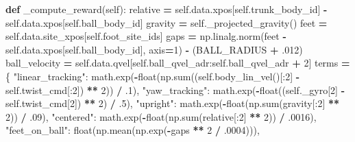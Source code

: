 \documentclass[
  chinese,
  11pt,
  letterpaper,
]{article}
\newenvironment{Shaded}{\begin{snugshade}}{\end{snugshade}}
\newcommand{\BuiltInTok}[1]{#1}
\newcommand{\DecValTok}[1]{\textcolor[rgb]{0.00,0.00,0.81}{#1}}
\newcommand{\FloatTok}[1]{\textcolor[rgb]{0.00,0.00,0.81}{#1}}
\newcommand{\KeywordTok}[1]{\textcolor[rgb]{0.13,0.29,0.53}{\textbf{#1}}}
\newcommand{\NormalTok}[1]{#1}
\newcommand{\OperatorTok}[1]{\textcolor[rgb]{0.81,0.36,0.00}{\textbf{#1}}}
\newcommand{\StringTok}[1]{\textcolor[rgb]{0.31,0.60,0.02}{#1}}
\newcommand{\VariableTok}[1]{\textcolor[rgb]{0.00,0.00,0.00}{#1}}
\renewenvironment{Shaded}{\par\smallskip}{\par\smallskip}
\begin{document}
\begin{Shaded}
\begin{Highlighting}[]
    \KeywordTok{def}\NormalTok{ \_compute\_reward(}\VariableTok{self}\NormalTok{):}
\NormalTok{        relative }\OperatorTok{=} \VariableTok{self}\NormalTok{.data.xpos[}\VariableTok{self}\NormalTok{.trunk\_body\_id] }\OperatorTok{{-}} \VariableTok{self}\NormalTok{.data.xpos[}\VariableTok{self}\NormalTok{.ball\_body\_id]}
\NormalTok{        gravity }\OperatorTok{=} \VariableTok{self}\NormalTok{.\_projected\_gravity()}
\NormalTok{        feet }\OperatorTok{=} \VariableTok{self}\NormalTok{.data.site\_xpos[}\VariableTok{self}\NormalTok{.foot\_site\_ids]}
\NormalTok{        gaps }\OperatorTok{=}\NormalTok{ np.linalg.norm(feet }\OperatorTok{{-}} \VariableTok{self}\NormalTok{.data.xpos[}\VariableTok{self}\NormalTok{.ball\_body\_id], axis}\OperatorTok{=}\DecValTok{1}\NormalTok{) }\OperatorTok{{-}}\NormalTok{ (BALL\_RADIUS }\OperatorTok{+} \FloatTok{.012}\NormalTok{)}
\NormalTok{        ball\_velocity }\OperatorTok{=} \VariableTok{self}\NormalTok{.data.qvel[}\VariableTok{self}\NormalTok{.ball\_qvel\_adr:}\VariableTok{self}\NormalTok{.ball\_qvel\_adr }\OperatorTok{+} \DecValTok{2}\NormalTok{]}
\NormalTok{        terms }\OperatorTok{=}\NormalTok{ \{}
            \StringTok{"linear\_tracking"}\NormalTok{: math.exp(}\OperatorTok{{-}}\BuiltInTok{float}\NormalTok{(np.}\BuiltInTok{sum}\NormalTok{((}\VariableTok{self}\NormalTok{.body\_lin\_vel()[:}\DecValTok{2}\NormalTok{] }\OperatorTok{{-}} \VariableTok{self}\NormalTok{.twist\_cmd[:}\DecValTok{2}\NormalTok{]) }\OperatorTok{**} \DecValTok{2}\NormalTok{)) }\OperatorTok{/} \FloatTok{.1}\NormalTok{),}
            \StringTok{"yaw\_tracking"}\NormalTok{: math.exp(}\OperatorTok{{-}}\BuiltInTok{float}\NormalTok{((}\VariableTok{self}\NormalTok{.\_gyro[}\DecValTok{2}\NormalTok{] }\OperatorTok{{-}} \VariableTok{self}\NormalTok{.twist\_cmd[}\DecValTok{2}\NormalTok{]) }\OperatorTok{**} \DecValTok{2}\NormalTok{) }\OperatorTok{/} \FloatTok{.5}\NormalTok{),}
            \StringTok{"upright"}\NormalTok{: math.exp(}\OperatorTok{{-}}\BuiltInTok{float}\NormalTok{(np.}\BuiltInTok{sum}\NormalTok{(gravity[:}\DecValTok{2}\NormalTok{] }\OperatorTok{**} \DecValTok{2}\NormalTok{)) }\OperatorTok{/} \FloatTok{.09}\NormalTok{),}
            \StringTok{"centered"}\NormalTok{: math.exp(}\OperatorTok{{-}}\BuiltInTok{float}\NormalTok{(np.}\BuiltInTok{sum}\NormalTok{(relative[:}\DecValTok{2}\NormalTok{] }\OperatorTok{**} \DecValTok{2}\NormalTok{)) }\OperatorTok{/} \FloatTok{.0016}\NormalTok{),}
            \StringTok{"feet\_on\_ball"}\NormalTok{: }\BuiltInTok{float}\NormalTok{(np.mean(np.exp(}\OperatorTok{{-}}\NormalTok{gaps }\OperatorTok{**} \DecValTok{2} \OperatorTok{/} \FloatTok{.0004}\NormalTok{))),}

\end{Highlighting}
\end{Shaded}
\end{document}
